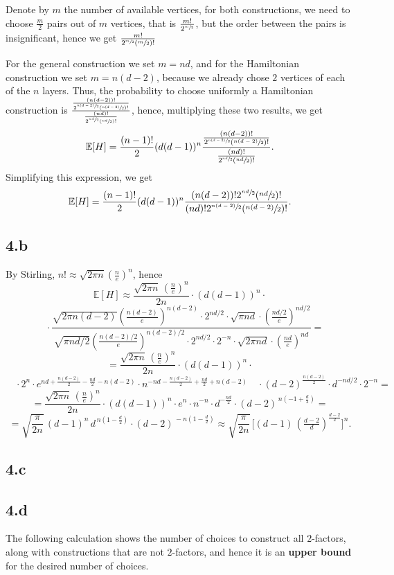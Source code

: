 \documentclass{article}
\begin{document}
Denote by $m$ the number of available vertices, for both constructions, we need to choose $\frac{m}{2}$ pairs out of $m$ vertices, that is $\frac{m!}{2^{\sfrac{m}{2}}}$, but the order between the pairs is insignificant, hence we get $\frac{m!}{2^{\sfrac{m}{2}}(\sfrac{m}{2})!}$

For the general construction we set $m=nd$, and for the Hamiltonian construction we set $m=n(d-2)$, because we already chose $2$ vertices of each of the $n$ layers. Thus, the probability to choose uniformly a Hamiltonian construction is $\frac{\frac{(n(d-2))!}{2^{\sfrac{n(d-2)}{2}}(\sfrac{n(d-2)}{2})!}}{\frac{(nd)!}{2^{\sfrac{nd}{2}}(\sfrac{nd}{2})!}}$, hence, multiplying these two results, we get \[
\mathbb{E}[H]=\frac{(n-1)!}{2}(d(d-1))^n\frac{\frac{(n(d-2))!}{2^{\sfrac{n(d-2)}{2}}(\sfrac{n(d-2)}{2})!}}{\frac{(nd)!}{2^{\sfrac{nd}{2}}(\sfrac{nd}{2})!}}
.\]
Simplifying this expression, we get
\[
\mathbb{E}[H]=\frac{(n-1)!}{2}(d(d-1))^n\frac{(n(d-2))!2^{\sfrac{nd}{2}}(\sfrac{nd}{2})!}{(nd)!2^{\sfrac{n(d-2)}{2}}(\sfrac{n(d-2)}{2})!}
.\]
\subsection*{4.b}
By Stirling, $n!\approx\sqrt{2\pi{n}}(\frac{n}{e})^n$, hence 
\[\mathbb{E}[H]\approx\frac{\sqrt{2\pi n}\,\left(\tfrac{n}{e}\right)^n}{2n}
\cdot(d(d-1))^n\cdot\]\[
\quad\cdot\frac{\sqrt{2\pi{n(d-2)}}\left(\tfrac{n(d-2)}{e}\right)^{n(d-2)}\cdot{2^{nd/2}}\cdot\sqrt{\pi nd}\cdot\left(\tfrac{nd/2}{e}\right)^{nd/2}}
         {\sqrt{\pi nd/2}\left(\tfrac{n(d-2)/2}{e}\right)^{n(d-2)/2}\cdot 2^{nd/2}\cdot2^{-n}\cdot\sqrt{2\pi nd}\cdot\left(\tfrac{nd}{e}\right)^{nd}}
=\]\[=\frac{\sqrt{2\pi{n}}\,\left(\tfrac{n}{e}\right)^n}{2n}\cdot(d(d-1))^n\cdot\]
\[\quad\cdot2^n\cdot e^{nd+\tfrac{n(d-2)}{2}-\tfrac{nd}{2}-n(d-2)}\cdot{n}^{-nd- \tfrac{n(d-2)}{2}+\tfrac{nd}{2}+n(d-2)}
\quad\cdot(d-2)^{\tfrac{n(d-2)}{2}} \cdot{d}^{-nd/2}\cdot{2^{-n}}
=\]\[=\frac{\sqrt{2\pi n}\,\left(\tfrac{n}{e}\right)^n}{2n}\cdot(d(d-1))^n\cdot{e^n} \cdot{n^{-n}}
    \cdot{d}^{-\tfrac{nd}{2}}\cdot(d-2)^{\,n(-1+\tfrac{d}{2})}
=\]\[=\sqrt{\frac{\pi}{2n}}\,(d-1)^n\,d^{\,n(1-\tfrac{d}{2})}\cdot(d-2)^{\,-n(1-\tfrac{d}{2})}
\approx\sqrt{\frac{\pi}{2n}}\,\Big[(d-1)\,\left(\tfrac{d-2}{d}\right)^{\tfrac{d-2}{2}}\Big]^n.\]
\subsection*{4.c}

\subsection*{4.d}
The following calculation shows the number of choices to construct all $2$-factors, along with constructions that are not $2$-factors, and hence it is an \textbf{upper bound} for the desired number of choices.
\end{document}
